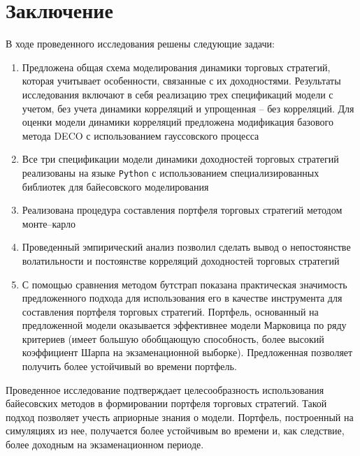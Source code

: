 \chapter*{Заключение}

В ходе проведенного исследования решены следующие задачи:
\begin{enumerate}
	\item Предложена общая схема моделирования динамики торговых стратегий, которая учитывает особенности, связанные с их доходностями. Результаты исследования включают в себя реализацию трех спецификаций модели с учетом, без учета динамики корреляций и упрощенная -- без корреляций. Для оценки модели динамики корреляций предложена модификация базового метода DECO с использованием гауссовского процесса

	\item Все три спецификации модели динамики доходностей торговых стратегий реализованы на языке \texttt{Python} с использованием специализированных библиотек для байесовского моделирования
	
	\item Реализована процедура составления портфеля торговых стратегий методом монте--карло

	\item Проведенный эмпирический анализ позволил сделать вывод о непостоянстве волатильности и постоянстве корреляций доходностей торговых стратегий

	\item С помощью сравнения методом бутстрап показана практическая значимость предложенного подхода для использования его в качестве инструмента для составления портфеля торговых стратегий. Портфель, основанный на предложенной модели оказывается эффективнее модели Марковица по ряду критериев (имеет большую обобщающую способность, более высокий коэффициент Шарпа на экзаменационной выборке). Предложенная позволяет получить более устойчивый во времени портфель.
\end{enumerate}

Проведенное исследование подтверждает целесообразность использования байесовских методов в формировании портфеля торговых стратегий. Такой подход позволяет учесть априорные знания о модели. Портфель, построенный на симуляциях из нее, получается более устойчивым во времени и, как следствие, более доходным на экзаменационном периоде.

